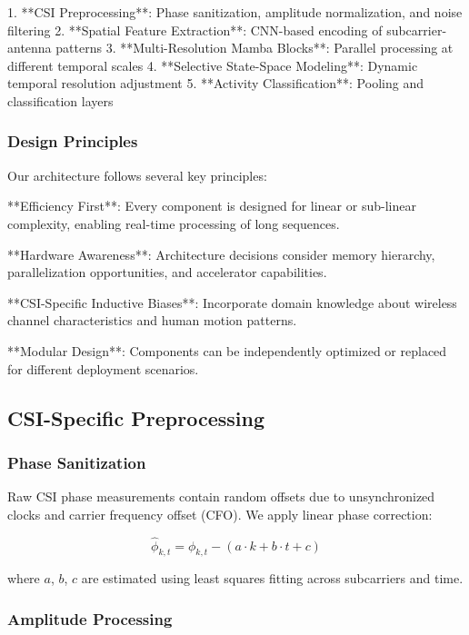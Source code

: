 \documentclass[10pt,journal,compsoc]{IEEEtran}
\begin{document}
1. **CSI Preprocessing**: Phase sanitization, amplitude normalization, and noise filtering
2. **Spatial Feature Extraction**: CNN-based encoding of subcarrier-antenna patterns
3. **Multi-Resolution Mamba Blocks**: Parallel processing at different temporal scales
4. **Selective State-Space Modeling**: Dynamic temporal resolution adjustment
5. **Activity Classification**: Pooling and classification layers

\subsubsection{Design Principles}

Our architecture follows several key principles:

**Efficiency First**: Every component is designed for linear or sub-linear complexity, enabling real-time processing of long sequences.

**Hardware Awareness**: Architecture decisions consider memory hierarchy, parallelization opportunities, and accelerator capabilities.

**CSI-Specific Inductive Biases**: Incorporate domain knowledge about wireless channel characteristics and human motion patterns.

**Modular Design**: Components can be independently optimized or replaced for different deployment scenarios.

\subsection{CSI-Specific Preprocessing}

\subsubsection{Phase Sanitization}

Raw CSI phase measurements contain random offsets due to unsynchronized clocks and carrier frequency offset (CFO). We apply linear phase correction:

\begin{equation}
\hat{\phi}_{k,t} = \phi_{k,t} - (a \cdot k + b \cdot t + c)
\end{equation}

where $a$, $b$, $c$ are estimated using least squares fitting across subcarriers and time.

\subsubsection{Amplitude Processing}
\end{document}
